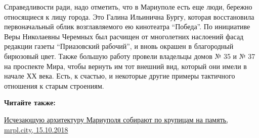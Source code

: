 Справедливости ради, надо отметить, что в Мариуполе есть еще люди, бережно
относящиеся к лицу города. Это Галина Ильинична Бургу, которая восстановила
первоначальный облик возглавляемого ею кинотеатра \enquote{Победа}. По инициативе Веры
Николаевны Черемных был расчищен от многолетних наслоений фасад редакции газеты
\enquote{Приазовский рабочий}, и вновь окрашен в благородный бирюзовый цвет. Также
большую работу провели владельцы домов № 35 и № 37 на проспекте Мира, чтобы
вернуть им тот внешний вид, который они имели в начале ХХ века. Есть, к
счастью, и некоторые другие примеры тактичного отношения к старым строениям.

\vspace{0.5cm}
\begin{minipage}{0.9\textwidth}
\textbf{Читайте также:} 

\href{https://mrpl.city/news/view/ischezayushhuyu-arhitekturu-mariupolya-sobirayut-po-krupitsam-na-pamyatfoto-plusvideo}{%
Исчезающую архитектуру Мариуполя собирают по крупицам на память, mrpl.city, 15.10.2018}
\end{minipage}
\vspace{0.5cm}
